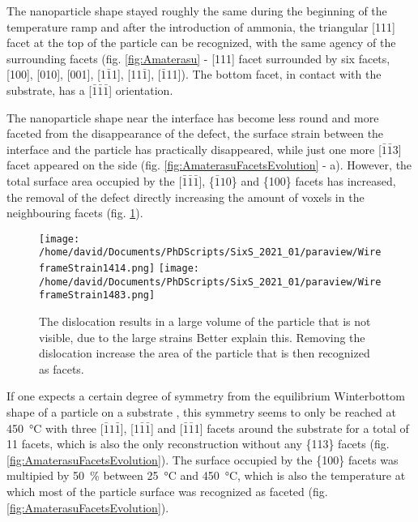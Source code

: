 The nanoparticle shape stayed roughly the same during the beginning of the temperature ramp and after the introduction of ammonia, the triangular [111] facet at the top of the particle can be recognized, with the same agency of the surrounding facets (fig. \ref{fig:Amaterasu} - [111] facet surrounded by six facets, [100], [010], [001], [1$\bar{1}$1], [11$\bar{1}$], [$\bar{1}$11]).
The bottom facet, in contact with the substrate, has a [$\bar{1}\bar{1}\bar{1}$] orientation.

The nanoparticle shape near the interface has become less round and more faceted from the disappearance of the defect, the surface strain between the interface and the particle has practically disappeared, while just one more [$\bar{1}\bar{1}3$] facet appeared on the side (fig. \ref{fig:AmaterasuFacetsEvolution} - a).
However, the total surface area occupied by the [$\bar{1}\bar{1}\bar{1}$], \{$\bar{1}10$\} and \{100\} facets has increased, the removal of the defect directly increasing the amount of voxels in the neighbouring facets (fig. \ref{fig:AmaterasuDefect}).

\begin{figure}[!htb]
    \centering
    \texttt{[image: /home/david/Documents/PhDScripts/SixS\_2021\_01/paraview/WireframeStrain1414.png]}
    \texttt{[image: /home/david/Documents/PhDScripts/SixS\_2021\_01/paraview/WireframeStrain1483.png]}
    \caption{
        The dislocation results in a large volume of the particle that is not visible, due to the large strains \textcolor{Important}{Better explain this}.
        Removing the dislocation increase the area of the particle that is then recognized as facets.
    }
    \label{fig:AmaterasuDefect}
\end{figure}

If one expects a certain degree of symmetry from the equilibrium Winterbottom shape of a particle on a substrate \parencite{WINTERBOTTOM1967, Boukouvala2021}, this symmetry seems to only be reached at \qty{450}{\degreeCelsius} with three [$\bar{1}1\bar{1}$], [1$\bar{1}\bar{1}$] and [$\bar{1}\bar{1}$1] facets around the substrate for a total of 11 facets, which is also the only reconstruction without any \{113\} facets (fig. \ref{fig:AmaterasuFacetsEvolution}).
The surface occupied by the \{100\} facets was multipied by \qty{50}{\percent} between \qty{25}{\degreeCelsius} and \qty{450}{\degreeCelsius}, which is also the temperature at which most of the particle surface was recognized as faceted (fig. \ref{fig:AmaterasuFacetsEvolution}).

